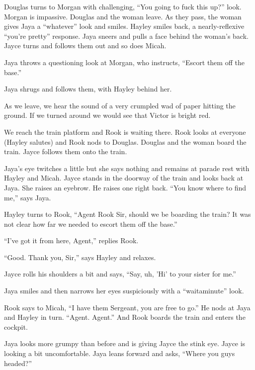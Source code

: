 Douglas turns to Morgan with challenging, ``You going to fuck this up?'' look.  Morgan is impassive.  Douglas and the woman leave.  As they pass, the woman gives Jaya a ``whatever'' look and smiles.  Hayley smiles back, a nearly-reflexive ``you're pretty'' response.  Jaya sneers and pulls a face behind the woman's back.  Jayce turns and follows them out and so does Micah.

Jaya throws a questioning look at Morgan, who instructs, ``Escort them off the base.''

Jaya shrugs and follows them, with Hayley behind her.  

As we leave, we hear the sound of a very crumpled wad of paper hitting the ground.  If we turned around we would see that Victor is bright red.





We reach the train platform and Rook is waiting there.  Rook looks at everyone (Hayley salutes) and Rook nods to Douglas. Douglas and the woman board the train.  Jayce follows them onto the train.



Jaya's eye twitches a little but she says nothing and remains at parade rest with Hayley and Micah.  Jayce stands in the doorway of the train and looks back at Jaya.  She raises an eyebrow.  He raises one right back.  ``You know where to find me,'' says Jaya.



Hayley turns to Rook, ``Agent Rook Sir, should we be boarding the train?  It was not clear how far we needed to escort them off the base.''

``I've got it from here, Agent,'' replies Rook.

``Good.  Thank you, Sir,'' says Hayley and relaxes.



Jayce rolls his shoulders a bit and says, ``Say, uh, 'Hi' to your sister for me.''

Jaya smiles and then narrows her eyes suspiciously with a ``waitaminute'' look.



Rook says to Micah, ``I have them Sergeant, you are free to go.'' He nods at Jaya and Hayley in turn. ``Agent.  Agent.''  And Rook boards the train and enters the cockpit.



Jaya looks more grumpy than before and is giving Jayce the stink eye.  Jayce is looking a bit uncomfortable.  Jaya leans forward and asks, ``Where you guys headed?''

